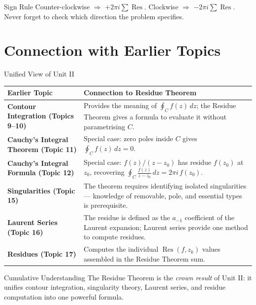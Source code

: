 \documentclass[12pt,a4paper]{article}
\begin{document}
\begin{learnbox}{Sign Rule}
Counter-clockwise $\Rightarrow$ $+2\pi i \sum \operatorname{Res}$.
Clockwise $\Rightarrow$ $-2\pi i \sum \operatorname{Res}$.
Never forget to check which direction the problem specifies.
\end{learnbox}

\section{Connection with Earlier Topics}

\begin{infobox}{Unified View of Unit II}
\begin{tabular}{>{\bfseries}p{3.5cm} p{10cm}}
\toprule
Earlier Topic & Connection to Residue Theorem \\
\midrule
Contour Integration (Topics 9--10) &
  Provides the meaning of $\oint_C f(z)\,dz$; the Residue Theorem
  gives a formula to evaluate it without parametrising $C$. \\
Cauchy's Integral Theorem (Topic 11) &
  Special case: zero poles inside $C$ gives $\oint_C f(z)\,dz = 0$. \\
Cauchy's Integral Formula (Topic 12) &
  Special case: $f(z)/(z-z_0)$ has residue $f(z_0)$ at $z_0$, recovering
  $\oint_C \frac{f(z)}{z-z_0}\,dz = 2\pi i\,f(z_0)$. \\
Singularities (Topic 15) &
  The theorem requires identifying isolated singularities --- knowledge of
  removable, pole, and essential types is prerequisite. \\
Laurent Series (Topic 16) &
  The residue is defined as the $a_{-1}$ coefficient of the Laurent expansion;
  Laurent series provide one method to compute residues. \\
Residues (Topic 17) &
  Computes the individual $\operatorname{Res}(f,z_k)$ values assembled in
  the Residue Theorem sum. \\
\bottomrule
\end{tabular}
\end{infobox}

\begin{learnbox}{Cumulative Understanding}
The Residue Theorem is the \emph{crown result} of Unit II: it unifies contour
integration, singularity theory, Laurent series, and residue computation
into one powerful formula.
\end{learnbox}
\end{document}
